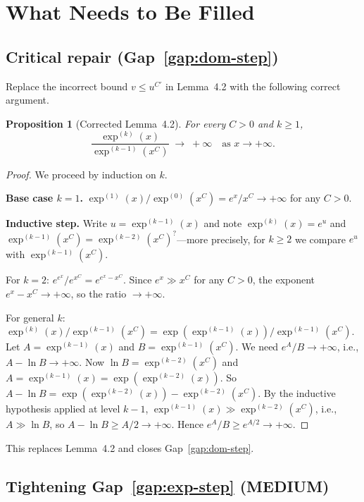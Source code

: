 \documentclass[12pt,a4paper]{article}
\newtheorem{proposition}[theorem]{Proposition}
\theoremstyle{definition}
\theoremstyle{remark}
\begin{document}
\section{What Needs to Be Filled}\label{sec:gaps-to-fill}

\subsection{Critical repair (Gap~\ref{gap:dom-step})}

Replace the incorrect bound $v\leq u^{C'}$ in Lemma~4.2 with the following
correct argument.

\begin{proposition}[Corrected Lemma~4.2]\label{prop:corrected-dom}
For every $C>0$ and $k\geq 1$,
\[
  \frac{\exp^{(k)}(x)}{\exp^{(k-1)}(x^C)} \;\to\; +\infty
  \quad\text{as }x\to+\infty.
\]
\end{proposition}
\begin{proof}
We proceed by induction on $k$.

\textbf{Base case $k=1$.}
$\exp^{(1)}(x)/\exp^{(0)}(x^C)=e^x/x^C\to+\infty$ for any $C>0$.

\textbf{Inductive step.}
Write $u=\exp^{(k-1)}(x)$ and note
$\exp^{(k)}(x)=e^u$ and $\exp^{(k-1)}(x^C)=\exp^{(k-2)}(x^C)^{?}$---more
precisely, for $k\geq 2$ we compare
$e^u$ with $\exp^{(k-1)}(x^C)$.

For $k=2$: $e^{e^x}/e^{x^C}=e^{e^x-x^C}$.  Since $e^x\gg x^C$ for any
$C>0$, the exponent $e^x-x^C\to+\infty$, so the ratio $\to+\infty$.

For general $k$: $\exp^{(k)}(x)/\exp^{(k-1)}(x^C)
=\exp(\exp^{(k-1)}(x))/\exp^{(k-1)}(x^C)$.
Let $A=\exp^{(k-1)}(x)$ and $B=\exp^{(k-1)}(x^C)$.
We need $e^A/B\to+\infty$, i.e., $A-\ln B\to+\infty$.
Now $\ln B=\exp^{(k-2)}(x^C)$ and $A=\exp^{(k-1)}(x)=\exp(\exp^{(k-2)}(x))$.
So $A-\ln B=\exp(\exp^{(k-2)}(x))-\exp^{(k-2)}(x^C)$.
By the inductive hypothesis applied at level $k-1$,
$\exp^{(k-1)}(x)\gg\exp^{(k-2)}(x^C)$, i.e., $A\gg\ln B$,
so $A-\ln B\geq A/2\to+\infty$.  Hence $e^A/B\geq e^{A/2}\to+\infty$.
\end{proof}

This replaces Lemma~4.2 and closes Gap~\ref{gap:dom-step}.

\subsection{Tightening Gap~\ref{gap:exp-step} (MEDIUM)}
\end{document}
